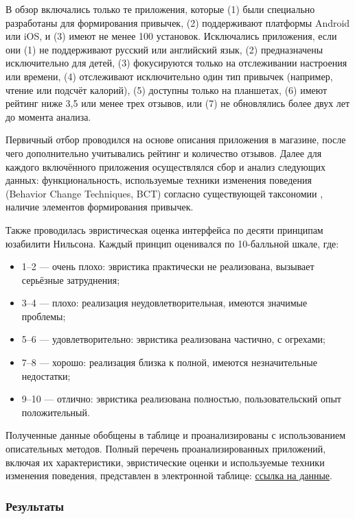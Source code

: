\documentclass[pdflatex,sn-mathphys-num]{sn-jnl}%
\theoremstyle{thmstyleone}%
\theoremstyle{thmstyletwo}%
\theoremstyle{thmstylethree}%
\begin{document}
В обзор включались только те приложения, которые (1) были специально разработаны для формирования привычек, (2) поддерживают платформы Android или iOS, и (3) имеют не менее 100 установок. Исключались приложения, если они (1) не поддерживают русский или английский язык, (2) предназначены исключительно для детей, (3) фокусируются только на отслеживании настроения или времени, (4) отслеживают исключительно один тип привычек (например, чтение или подсчёт калорий), (5) доступны только на планшетах, (6) имеют рейтинг ниже 3{,}5 или менее трех отзывов, или (7) не обновлялись более двух лет до момента анализа. 

Первичный отбор проводился на основе описания приложения в магазине, после чего дополнительно учитывались рейтинг и количество отзывов. Далее для каждого включённого приложения осуществлялся сбор и анализ следующих данных: функциональность, используемые техники изменения поведения (Behavior Change Techniques, BCT) согласно существующей таксономии \cite{michie_2008_bct}, наличие элементов формирования привычек.

Также проводилась эвристическая оценка интерфейса по десяти принципам юзабилити Нильсона. Каждый принцип оценивался по 10-балльной шкале, где:

\begin{itemize}
    \item 1–2 — очень плохо: эвристика практически не реализована, вызывает серьёзные затруднения;
    \item 3–4 — плохо: реализация неудовлетворительная, имеются значимые проблемы;
    \item 5–6 — удовлетворительно: эвристика реализована частично, с огрехами;
    \item 7–8 — хорошо: реализация близка к полной, имеются незначительные недостатки;
    \item 9–10 — отлично: эвристика реализована полностью, пользовательский опыт положительный.
\end{itemize}

Полученные данные обобщены в таблице и проанализированы с использованием описательных методов. Полный перечень проанализированных приложений, включая их характеристики, эвристические оценки и используемые техники изменения поведения, представлен в электронной таблице: \href{https://docs.google.com/spreadsheets/d/1RScNqPcjewJ4yKeazq6BL-yURvEvElnoeXhkra210Ag/edit?usp=sharing}{ссылка на данные}.

\subsubsection{Результаты}
\end{document}
